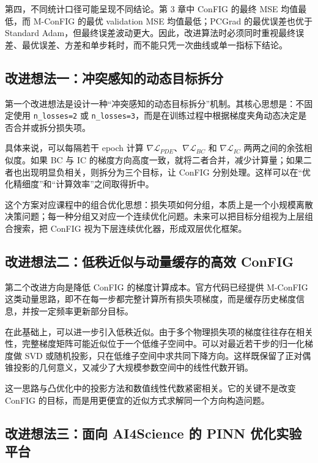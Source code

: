 \documentclass[UTF8,a4paper,12pt,fontset=none]{ctexart}
\begin{document}
第四，不同统计口径可能呈现不同结论。第 3 章中 ConFIG 的最终 MSE 均值最低，而 M-ConFIG 的最优 validation MSE 均值最低；PCGrad 的最优误差也优于 Standard Adam，但最终误差波动更大。因此，改进算法时必须同时重视最终误差、最优误差、方差和单步耗时，而不能只凭一次曲线或单一指标下结论。


\subsection{改进想法一：冲突感知的动态目标拆分}

第一个改进想法是设计一种“冲突感知的动态目标拆分”机制。其核心思想是：不固定使用 \texttt{n\_losses=2} 或 \texttt{n\_losses=3}，而是在训练过程中根据梯度夹角动态决定是否合并或拆分损失项。


具体来说，可以每隔若干 epoch 计算 $\nabla \mathcal{L}_{PDE}$、$\nabla \mathcal{L}_{BC}$ 和 $\nabla \mathcal{L}_{IC}$ 两两之间的余弦相似度。如果 BC 与 IC 的梯度方向高度一致，就将二者合并，减少计算量；如果二者也出现明显负相关，则拆分为三个目标，让 ConFIG 分别处理。这样可以在“优化精细度”和“计算效率”之间取得折中。


这个方案对应课程中的组合优化思想：损失项如何分组，本质上是一个小规模离散决策问题；每一种分组又对应一个连续优化问题。未来可以把目标分组视为上层组合搜索，把 ConFIG 视为下层连续优化器，形成双层优化框架。


\subsection{改进想法二：低秩近似与动量缓存的高效 ConFIG}

第二个改进方向是降低 ConFIG 的梯度计算成本。官方代码已经提供 M-ConFIG 这类动量思路，即不在每一步都完整计算所有损失项梯度，而是缓存历史梯度信息，并按一定频率更新部分目标。


在此基础上，可以进一步引入低秩近似。由于多个物理损失项的梯度往往存在相关性，完整梯度矩阵可能近似位于一个低维子空间中。可以对最近若干步的归一化梯度做 SVD 或随机投影，只在低维子空间中求共同下降方向。这样既保留了正对偶锥投影的几何意义，又减少了大规模参数空间中的线性代数开销。


这一思路与凸优化中的投影方法和数值线性代数紧密相关。它的关键不是改变 ConFIG 的目标，而是用更便宜的近似方式求解同一个方向构造问题。


\subsection{改进想法三：面向 AI4Science 的 PINN 优化实验平台}
\end{document}
